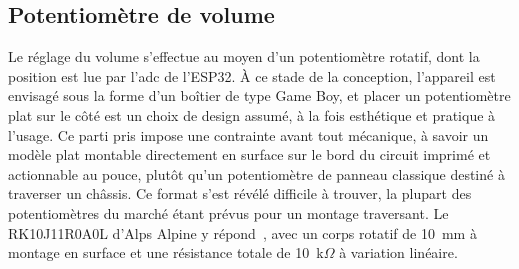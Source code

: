 


\subsection{Potentiomètre de volume}

Le réglage du volume s'effectue au moyen d'un potentiomètre rotatif, dont la position est lue par l'\gls{adc} de l'ESP32. À ce stade de la conception, l'appareil est envisagé sous la forme d'un boîtier de type Game Boy, et placer un potentiomètre plat sur le côté est un choix de design assumé, à la fois esthétique et pratique à l'usage. Ce parti pris impose une contrainte avant tout mécanique, à savoir un modèle plat montable directement en surface sur le bord du circuit imprimé et actionnable au pouce, plutôt qu'un potentiomètre de panneau classique destiné à traverser un châssis. Ce format s'est révélé difficile à trouver, la plupart des potentiomètres du marché étant prévus pour un montage traversant. Le RK10J11R0A0L d'Alps Alpine y répond~\cite{alps_RK10J11R0A0L}, avec un corps rotatif de 10~mm à montage en surface et une résistance totale de 10~k$\Omega$ à variation linéaire.